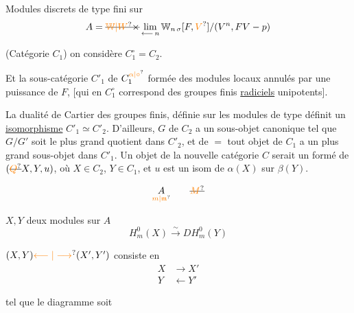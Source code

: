 Modules discrets  de type fini sur
\[
A=\deleted{\unsure{\mathbb W|W}\times}\lim_{\longleftarrow\,n}\mathbb W_{n\,\sigma}[F,\unsure{V}]/(V^n,FV-p)
\]

(Catégorie $C_1$) on considère $C_1^\circ=C_2$.

Et la sous-catégorie  $C'_1$ de $C_1^{\unsure{\alpha|\circ}}$ formée des modules locaux annulés par une puissance de $F$, [qui en $C_1^\circ$ correspond    des groupes finis \uline{radiciels} unipotents].


La dualité de Cartier des groupes finis, définie  sur les modules de type  définit un \uline{isomorphisme} $C'_1\simeq C'_2$.
D'ailleurs,  $G$ de $C_2$ a un sous-objet canonique tel que $G/G'$ soit le plus grand quotient dans $C'_2$, et de $=$ tout objet de $C_1$ a un plus grand sous-objet  dans $C'_1$. Un objet de la nouvelle catégorie $C$ serait un   formé de  $(\deleted{\unsure{Q}}X,Y,u)$, où $X\in C_2$, $Y\in C_1$, et $u$ est un isom de $\alpha(X)$ sur $\beta(Y)$.


\[\underset{\unsure{m|\mathfrak m}}{A}\qquad\deleted{\unsure{M}}\]

$X,Y$ deux modules sur $A$
\[H^0_m(X)\xrightarrow{\sim}DH^0_m(Y)\]

$(X,Y)\unsure{\longleftarrow|\longrightarrow}(X',Y')$ consiste en
\[\begin{aligned}X&\longrightarrow X'\\Y&\longleftarrow Y'\end{aligned}\]

tel que le diagramme
soit 

